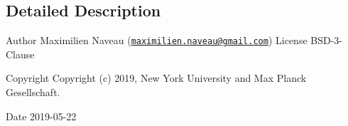 \subsection{Detailed Description}
\begin{DoxyAuthor}{Author}
Maximilien Naveau (\href{mailto:maximilien.naveau@gmail.com}{\tt maximilien.\+naveau@gmail.\+com})  License B\+S\+D-\/3-\/\+Clause 
\end{DoxyAuthor}
\begin{DoxyCopyright}{Copyright}
Copyright (c) 2019, New York University and Max Planck Gesellschaft. 
\end{DoxyCopyright}
\begin{DoxyDate}{Date}
2019-\/05-\/22 
\end{DoxyDate}
